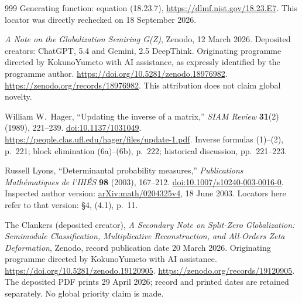 \begin{thebibliography}{999}
Generating function: equation (18.23.7),
\url{https://dlmf.nist.gov/18.23.E7}.
This locator was directly rechecked on 18 September 2026.

\emph{A Note on the Globalization Semiring G(Z)}, Zenodo,
12 March 2026. Deposited creators: ChatGPT, 5.4 and Gemini, 2.5 DeepThink.
Originating programme directed by KokunoYumeto with AI assistance,
as expressly identified by the programme author.
\url{https://doi.org/10.5281/zenodo.18976982}.
\url{https://zenodo.org/records/18976982}.
This attribution does not claim global novelty.


William W.~Hager, ``Updating the inverse of a matrix,''
\emph{SIAM Review} \textbf{31}(2) (1989), 221--239.
\href{https://doi.org/10.1137/1031049}{doi:10.1137/1031049}.
\url{https://people.clas.ufl.edu/hager/files/update-1.pdf}.
Inverse formulas (1)--(2), p.~221; block elimination (6a)--(6b),
p.~222; historical discussion, pp.~221--223.


Russell Lyons, ``Determinantal probability measures,''
\emph{Publications Math\'ematiques de l'IH\'ES} \textbf{98} (2003), 167--212.
\href{https://doi.org/10.1007/s10240-003-0016-0}{doi:10.1007/s10240-003-0016-0}.
Inspected author version: \href{https://arxiv.org/abs/math/0204325v4}{arXiv:math/0204325v4},
18 June 2003. Locators here refer to that version: \S4, (4.1), p.~11.


The Clankers (deposited creator), \emph{A Secondary Note on Split-Zero
Globalization: Semimodule Classification, Multiplicative Reconstruction,
and All-Orders Zeta Deformation}, Zenodo, record publication date
20 March 2026. Originating programme directed by KokunoYumeto
with AI assistance. \url{https://doi.org/10.5281/zenodo.19120905}.
\url{https://zenodo.org/records/19120905}.
The deposited PDF prints 29 April 2026; record and printed dates
are retained separately. No global priority claim is made.

\end{thebibliography}
